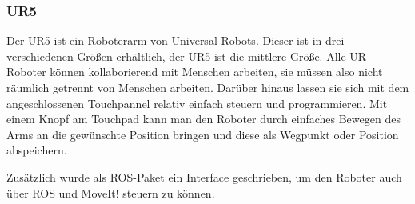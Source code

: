 \subsubsection{UR5} %
\label{ssub:ur5}
Der UR5 ist ein Roboterarm von Universal Robots. Dieser ist in drei verschiedenen Größen erhältlich, der UR5 ist die mittlere Größe. Alle UR-Roboter können kollaborierend mit Menschen arbeiten, sie müssen also nicht räumlich getrennt von Menschen arbeiten. Darüber hinaus lassen sie sich mit dem angeschlossenen Touchpannel relativ einfach steuern und programmieren. Mit einem Knopf am Touchpad kann man den Roboter durch einfaches Bewegen des Arms an die gewünschte Position bringen und diese als Wegpunkt oder Position abspeichern. 

Zusätzlich wurde als ROS-Paket ein Interface geschrieben, um den Roboter auch über ROS und MoveIt! steuern zu können.
